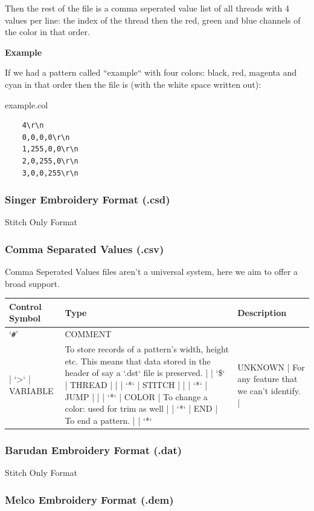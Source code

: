 \documentclass[a4paper, 11pt]{report}
\begin{document}
Then the rest of the file is a comma seperated value list of all threads with 4 values per line: the index of the thread then the red, green and blue channels of the color in that order.

\begin{flushleft}
\textbf{Example}
\end{flushleft}

If we had a pattern called ``example`` with four colors: black, red, magenta and 
cyan in that order then the file is (with the white space written out):

example.col

\begin{verbatim}
    4\r\n
    0,0,0,0\r\n
    1,255,0,0\r\n
    2,0,255,0\r\n
    3,0,0,255\r\n
\end{verbatim}

\subsubsection{Singer Embroidery Format (.csd)}

Stitch Only Format

\subsubsection{Comma Separated Values (.csv)}

Comma Seperated Values files aren't a universal system, here we aim to
offer a broad support.

\begin{tabular}{l l l}
Control Symbol & Type & Description \\
\hline
`\texttt{\#}' & COMMENT & \\
| `>` | VARIABLE & To store records of a pattern's width, height etc. This means that data stored in the header of say a `.dst` file is preserved. |
| `\$` | THREAD | |
| `*` | STITCH | |
| `*` | JUMP | |
| `*` | COLOR | To change a color: used for trim as well |
| `*` | END | To end a pattern. |
| `*` & UNKNOWN | For any feature that we can't identify. |
\end{tabular}

\subsubsection{Barudan Embroidery Format (.dat)}

Stitch Only Format

\subsubsection{Melco Embroidery Format (.dem)}
\end{document}

